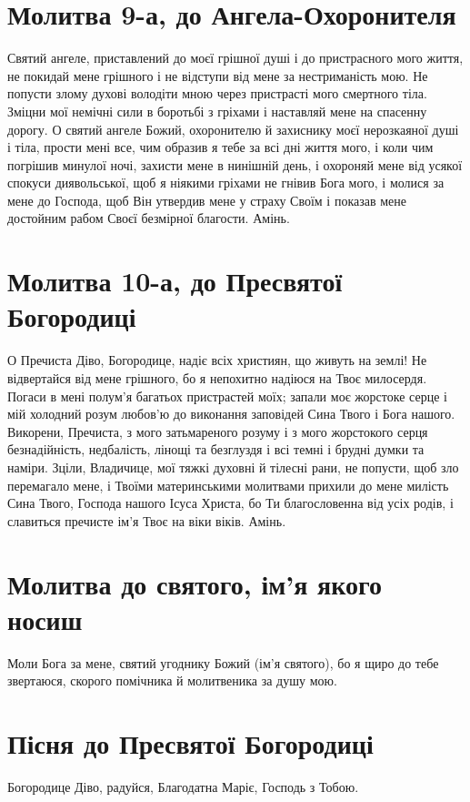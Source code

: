 \documentclass[chapters.tex]{subfiles}
\begin{document}
\section{Молитва 9-а, до Ангела-Охоронителя}
Святий ангеле, приставлений до моєї грішної душі і до пристрасного мого життя, не покидай мене грішного і не відступи від мене за нестриманість мою. Не попусти злому духові володіти мною через пристрасті мого смертного тіла. Зміцни мої немічні сили в боротьбі з гріхами і наставляй мене на спасенну дорогу. О святий ангеле Божий, охоронителю й захиснику моєї нерозкаяної душі і тіла, прости мені все, чим образив я тебе за всі дні життя мого, і коли чим погрішив минулої ночі, захисти мене в нинішній день, і охороняй мене від усякої спокуси диявольської, щоб я ніякими гріхами не гнівив Бога мого, і молися за мене до Господа, щоб Він утвердив мене у страху Своїм і показав мене достойним рабом Своєї безмірної благости. Амінь.

\section{Молитва 10-а, до Пресвятої Богородиці}
О Пречиста Діво, Богородице, надіє всіх християн, що живуть на землі! Не відвертайся від мене грішного, бо я непохитно надіюся на Твоє милосердя. Погаси в мені полум’я багатьох пристрастей моїх; запали моє жорстоке серце і мій холодний розум любов’ю до виконання заповідей Сина Твого і Бога нашого. Викорени, Пречиста, з мого затьмареного розуму і з мого жорстокого серця безнадійність, недбалість, лінощі та безглуздя і всі темні і брудні думки та наміри. Зціли, Владичице, мої тяжкі духовні й тілесні рани, не попусти, щоб зло перемагало мене, і Твоїми материнськими молитвами прихили до мене милість Сина Твого, Господа нашого Ісуса Христа, бо Ти благословенна від усіх родів, і славиться пречисте ім’я Твоє на віки віків. Амінь.

\section{Молитва до святого, ім’я якого носиш}
Моли Бога за мене, святий угоднику Божий (ім’я святого), бо я щиро до тебе звертаюся, скорого помічника й молитвеника за душу мою.

\section{Пісня до Пресвятої Богородиці}
Богородице Діво, радуйся, Благодатна Маріє, Господь з Тобою.
\end{document}
